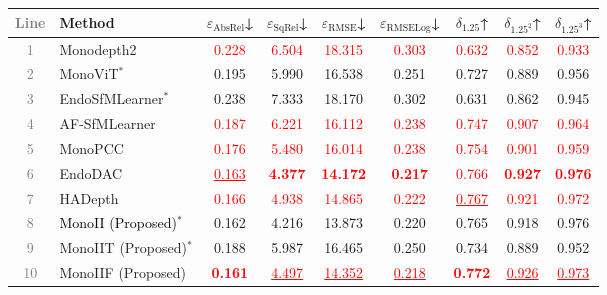 \documentclass[a4paper,fleqn]{cas-dc}
\begin{document}
{\begin{table}[!hbt]
\centering
\begin{tabular}{clccccccc}
\toprule
\textcolor{gray}{Line} & Method & $\varepsilon_\text{AbsRel}$↓ & 
        $\varepsilon_\text{SqRel}$↓ & 
        $\varepsilon_\text{RMSE}$↓ & 
        $\varepsilon_\text{RMSELog}$↓ & 
        $\delta_{1.25}$↑ & $\delta_{1.25^2}$↑ & 
        $\delta_{1.25^3}$↑ \\
\midrule
\textcolor{gray}{1} &Monodepth2     & \textcolor{red}{0.228} & \textcolor{red}{6.504} & \textcolor{red}{18.315} & \textcolor{red}{0.303} & \textcolor{red}{0.632} & \textcolor{red}{0.852} & \textcolor{red}{0.933} \\
\textcolor{gray}{2} &MonoViT$^{\ast}$ & 0.195 & 5.990 & 16.538 & 0.251 & 0.727 & 0.889 & 0.956 \\
\textcolor{gray}{3} &EndoSfMLearner$^{\ast}$ & 0.238 & 7.333 & 18.170 & 0.302 & 0.631 & 0.862 & 0.945 \\
\textcolor{gray}{4} &AF-SfMLearner  & \textcolor{red}{0.187} & \textcolor{red}{6.221} & \textcolor{red}{16.112} & \textcolor{red}{0.238} & \textcolor{red}{0.747} & \textcolor{red}{0.907} & \textcolor{red}{0.964} \\
\textcolor{gray}{5} &MonoPCC        & \textcolor{red}{0.176} & \textcolor{red}{5.480} & \textcolor{red}{16.014} & \textcolor{red}{0.238} & \textcolor{red}{0.754} & \textcolor{red}{0.901} & \textcolor{red}{0.959} \\
\textcolor{gray}{6} &EndoDAC        & \textcolor{red}{\underline{0.163}} & \textcolor{red}{\textbf{4.377}} & \textcolor{red}{\textbf{14.172}} & \textcolor{red}{\textbf{0.217}} & \textcolor{red}{0.766} & \textcolor{red}{\textbf{0.927}} & \textcolor{red}{\textbf{0.976}} \\
\textcolor{gray}{7} &HADepth        & \textcolor{red}{0.166} & \textcolor{red}{4.938} & \textcolor{red}{14.865} & \textcolor{red}{0.222} & \textcolor{red}{\underline{0.767}} & \textcolor{red}{0.921} & \textcolor{red}{0.972} \\
\midrule
\textcolor{gray}{8} & \textcolor{black}{MonoII (Proposed)}$^{\ast}$ & 0.162 & 4.216 & 13.873 & 0.220 & 0.765 & 0.918 & 0.976 \\
\textcolor{gray}{9} &MonoIIT (Proposed)$^{\ast}$ & 0.188 & 5.987 & 16.465 & 0.250 & 0.734 & 0.889 & 0.952 \\
\textcolor{gray}{10} &MonoIIF (Proposed) & \textcolor{red}{\textbf{0.161}} & \textcolor{red}{\underline{4.497}} & \textcolor{red}{\underline{14.352}} & \textcolor{red}{\underline{0.218}} & \textcolor{red}{\textbf{0.772}} & \textcolor{red}{\underline{0.926}} & \textcolor{red}{\underline{0.973}} \\

\end{tabular}
\end{table}}
\end{document}
